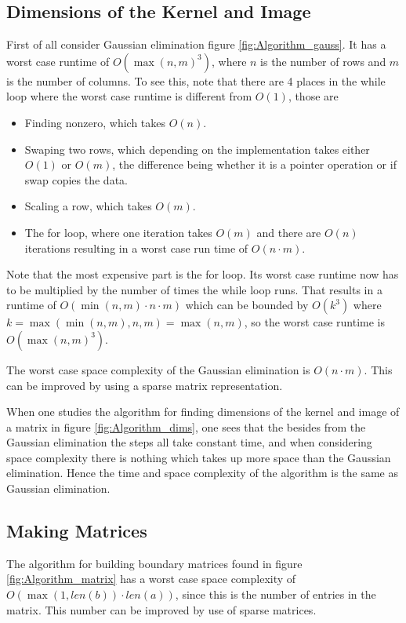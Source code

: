 \documentclass[11pt,a4paper,twoside, openright]{report}
\begin{document}
\subsection{Dimensions of the Kernel and Image}
First of all consider Gaussian elimination figure \ref{fig:Algorithm_gauss}. It has a worst case runtime of $O(\max(n,m)^3)$, where $n$ is the number of rows and $m$ is the number of columns. To see this, note that there are 4 places in the while loop where the worst case runtime is different from $O(1)$, those are 
\begin{itemize}
\item Finding nonzero, which takes $O(n)$.
\item Swaping two rows, which depending on the implementation takes either $O(1)$ or $O(m)$, the difference being whether it is a pointer operation or if swap copies the data.
\item Scaling a row, which takes $O(m)$.
\item The for loop, where one iteration takes $O(m)$ and there are $O(n)$ iterations resulting in a worst case run time of $O(n\cdot m)$.
\end{itemize}
Note that the most expensive part is the for loop. Its worst case runtime now has to be multiplied by the number of times the while loop runs. That results in a runtime of $O(\min(n,m)\cdot n \cdot m)$ which can be bounded by $O(k^3)$ where $k = \max(\min(n,m), n, m)=\max(n,m)$, so the worst case runtime is $O(\max(n,m)^3)$.

The worst case space complexity of the Gaussian elimination is $O(n\cdot m)$. This can be improved by using a sparse matrix representation.

When one studies the algorithm for finding dimensions of the kernel and image of a matrix in figure \ref{fig:Algorithm_dims}, one sees that the besides from the Gaussian elimination the steps all take constant time, and when considering space complexity there is nothing which takes up more space than the Gaussian elimination. Hence the time and space complexity of the algorithm is the same as Gaussian elimination.

\subsection{Making Matrices}
The algorithm for building boundary matrices found in figure \ref{fig:Algorithm_matrix} has a worst case space complexity of $O(\max(1,len(b))\cdot len(a))$, since this is the number of entries in the matrix. This number can be improved by use of sparse matrices.
\end{document}
